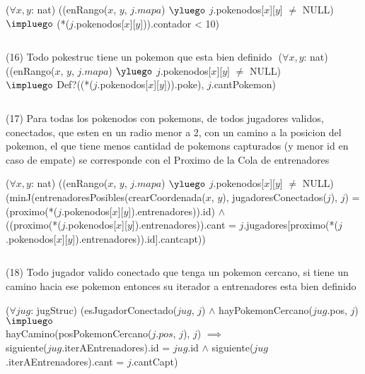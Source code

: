 \begin{Representacion}
($\forall x, y$: nat) ((enRango($x$, $y$, $j.mapa$) $\yluego$ $j$.pokenodos[$x$][$y$] $\neq$ NULL) \\
  $\impluego$ (*($j$.pokenodos[$x$][$y$])).contador < 10)

$ $\newline

(16) Todo pokestruc tiene un pokemon que esta bien definido $ $\newline
($\forall x, y$: nat) ((enRango($x$, $y$, $j.mapa$) $\yluego$ $j$.pokenodos[$x$][$y$] $\neq$ NULL) \\
  $\impluego$ Def?((*($j$.pokenodos[$x$][$y$])).poke), $j$.cantPokemon)

$ $\newline


(17) Para todas los pokenodos con pokemons, de todos jugadores validos, conectados, que esten en un radio menor a 2, con un camino a la posicion del pokemon, el que tiene menos cantidad de pokemons capturados (y menor id en caso de empate) se corresponde con el Proximo de la Cola de entrenadores $ $\newline

($\forall x, y$: nat) ((enRango($x$, $y$, $j.mapa$) $\yluego$ $j$.pokenodos[$x$][$y$] $\neq$ NULL) \\
  (minJ(entrenadoresPosibles(crearCoordenada($x$, $y$), jugadoresConectados($j$), $j$) = \\
  (proximo(*($j$.pokenodos[$x$][$y$]).entrenadores)).id) $\land$ \\
  ((proximo(*($j$.pokenodos[$x$][$y$]).entrenadores)).cant = $j$.jugadores[proximo(*($j$.pokenodos[$x$][$y$]).entrenadores)).id].cantcapt))
  
$ $\newline

(18) Todo jugador valido conectado que tenga un pokemon cercano, si tiene un camino hacia ese pokemon entonces su iterador a entrenadores esta bien definido $ $\newline

($\forall jug$: jugStruc) (esJugadorConectado($jug$, $j$) $\land$ hayPokemonCercano($jug$.pos, $j$) $\impluego$ \\
hayCamino(posPokemonCercano($j.pos$, $j$), $j$) $\implies$ \\
siguiente($jug$.iterAEntrenadores).id = $jug$.id $\land$ siguiente($jug$.iterAEntrenadores).cant = $j$.cantCapt) 


\end{Representacion}
